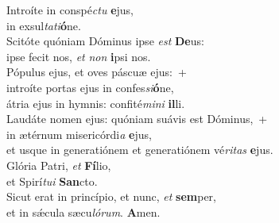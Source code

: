 \evenverse Introíte in conspé\textit{ctu} \textbf{e}jus,~\*\\
\evenverse in exsul\textit{ta}\textit{ti}\textbf{ó}ne.\\
\oddverse Scitóte quóniam Dóminus ipse \textit{est} \textbf{De}us:~\*\\
\oddverse ipse fecit nos, \textit{et} \textit{non} \textbf{i}psi nos.\\
\evenverse Pópulus ejus, et oves páscuæ ejus:~+\\
\evenverse  introíte portas ejus in confes\textit{si}\textbf{ó}ne,~\*\\
\evenverse átria ejus in hymnis: confité\textit{mi}\textit{ni} \textbf{il}li.\\
\oddverse Laudáte nomen ejus: quóniam suávis est Dóminus,~+\\
\oddverse  in ætérnum misericórdi\textit{a} \textbf{e}jus,~\*\\
\oddverse et usque in generatiónem et generatiónem vé\textit{ri}\textit{tas} \textbf{e}jus.\\
\evenverse Glória Patri, \textit{et} \textbf{Fí}lio,~\*\\
\evenverse et Spirí\textit{tu}\textit{i} \textbf{San}cto.\\
\oddverse Sicut erat in princípio, et nunc, \textit{et} \textbf{sem}per,~\*\\
\oddverse et in sǽcula sæcu\textit{ló}\textit{rum}. \textbf{A}men.\\
